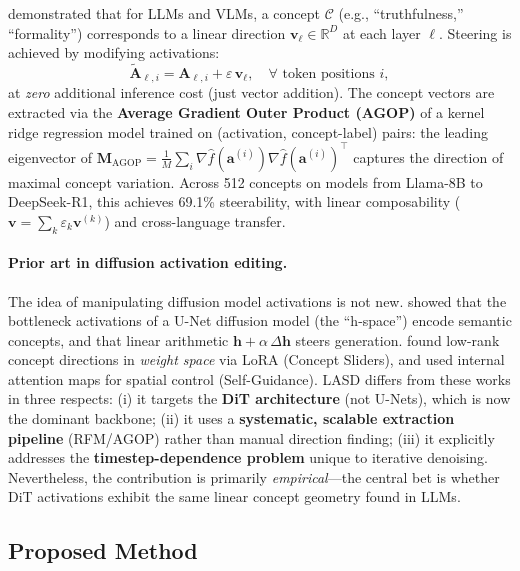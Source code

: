 \documentclass[11pt]{article}
\begin{document}
\citet{beaglehole2026universal} demonstrated that for LLMs and VLMs, a concept $\mathcal{C}$ (e.g., ``truthfulness,'' ``formality'') corresponds to a linear direction $\mathbf{v}_\ell \in \mathbb{R}^D$ at each layer $\ell$.
Steering is achieved by modifying activations:
\begin{equation}
    \tilde{\mathbf{A}}_{\ell,i} = \mathbf{A}_{\ell,i} + \varepsilon\, \mathbf{v}_\ell, \quad \forall \text{ token positions } i,
    \label{eq:llm_steering}
\end{equation}
at \emph{zero} additional inference cost (just vector addition).
The concept vectors are extracted via the \textbf{Average Gradient Outer Product (AGOP)} of a kernel ridge regression model trained on (activation, concept-label) pairs: the leading eigenvector of $\mathbf{M}_{\mathrm{AGOP}} = \frac{1}{M}\sum_i \nabla \hat{f}(\mathbf{a}^{(i)})\nabla \hat{f}(\mathbf{a}^{(i)})^\top$ captures the direction of maximal concept variation.
Across 512 concepts on models from Llama-8B to DeepSeek-R1, this achieves 69.1\% steerability, with linear composability ($\mathbf{v} = \sum_k \varepsilon_k \mathbf{v}^{(k)}$) and cross-language transfer.

\paragraph{Prior art in diffusion activation editing.}
The idea of manipulating diffusion model activations is not new.
\citet{kwon2023diffusion} showed that the bottleneck activations of a U-Net diffusion model (the ``h-space'') encode semantic concepts, and that linear arithmetic $\mathbf{h} + \alpha\,\Delta\mathbf{h}$ steers generation.
\citet{gandikota2023concept} found low-rank concept directions in \emph{weight space} via LoRA (Concept Sliders), and \citet{epstein2023selfguidance} used internal attention maps for spatial control (Self-Guidance).
LASD differs from these works in three respects:
(i) it targets the \textbf{DiT architecture} (not U-Nets), which is now the dominant backbone;
(ii) it uses a \textbf{systematic, scalable extraction pipeline} (RFM/AGOP) rather than manual direction finding;
(iii) it explicitly addresses the \textbf{timestep-dependence problem} unique to iterative denoising.
Nevertheless, the contribution is primarily \emph{empirical}---the central bet is whether DiT activations exhibit the same linear concept geometry found in LLMs.

\subsection{Proposed Method}
\end{document}
